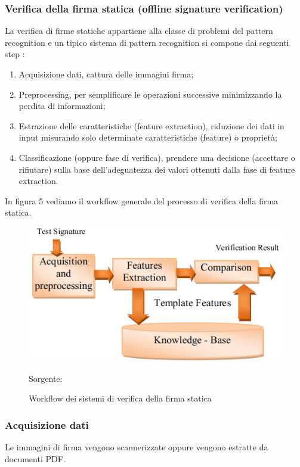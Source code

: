 \subsubsection{Verifica della firma statica (offline signature verification)}
\label{2.1.3}
La verifica di firme statiche appartiene alla classe di problemi del pattern recognition e un tipico sistema di pattern recognition si compone dai seguenti step \cite{2698894}:
\begin{enumerate}
\item Acquisizione dati, cattura delle immagini firma;
\item Preprocessing, per semplificare le operazioni successive minimizzando la perdita di informazioni;
\item Estrazione delle caratteristiche (feature extraction), riduzione dei dati in input misurando solo determinate caratteristiche (feature) o proprietà;
\item Classificazione (oppure fase di verifica), prendere una decisione (accettare o rifiutare) sulla base dell'adeguatezza dei valori ottenuti dalla fase di feature extraction.
\end{enumerate}
In figura 5 vediamo il workflow generale del processo di verifica della firma statica.
\begin{figure}[H]
\centering
\includegraphics[scale=0.8]{../Logo&Header/generalProcess.png}
\caption{Workflow dei sistemi di verifica della firma statica} Sorgente: \cite{4}
\end{figure}
\subsubsection*{Acquisizione dati}
\label{2.1.3.1}
Le immagini di firma vengono scannerizzate oppure vengono estratte da documenti PDF.
